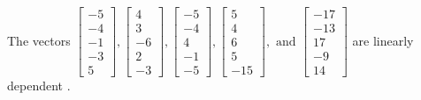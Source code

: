 \begin{exercise}
\begin{exerciseStatement}
  \end{exerciseStatement}
  \begin{exerciseAnswer}
   The vectors \(\left[\begin{array}{r}
-5 \\
-4 \\
-1 \\
-3 \\
5
\end{array}\right] , \left[\begin{array}{r}
4 \\
3 \\
-6 \\
2 \\
-3
\end{array}\right] , \left[\begin{array}{r}
-5 \\
-4 \\
4 \\
-1 \\
-5
\end{array}\right] , \left[\begin{array}{r}
5 \\
4 \\
6 \\
5 \\
-15
\end{array}\right] , \text{ and } \left[\begin{array}{r}
-17 \\
-13 \\
17 \\
-9 \\
14
\end{array}\right]\) are 
  	 linearly dependent  .
  


  \end{exerciseAnswer}
\end{exercise}